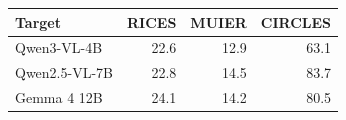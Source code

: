 \begin{tabular}{lrrr}
\toprule
Target & RICES & MUIER & CIRCLES \\
\midrule
Qwen3-VL-4B & 22.6 & 12.9 & 63.1 \\
Qwen2.5-VL-7B & 22.8 & 14.5 & 83.7 \\
Gemma 4 12B & 24.1 & 14.2 & 80.5 \\
\bottomrule
\end{tabular}
